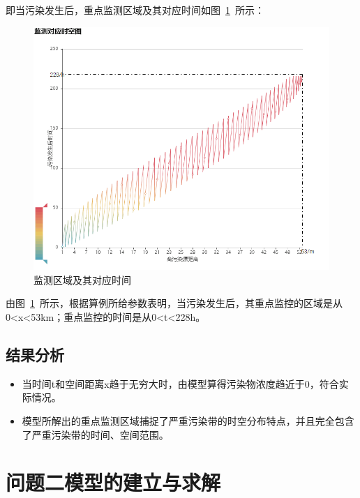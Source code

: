 \documentclass{whutmod}
\begin{document}
	即当污染发生后，重点监测区域及其对应时间如图~\ref{hblq}~所示：
			\begin{figure}[H]
		\centering
		\includegraphics[width=.9\textwidth]{figures/hblj.png}
		\caption{监测区域及其对应时间}\label{hblq}
	\end{figure}
	由图~\ref{hblq}~所示，根据算例所给参数表明，当污染发生后，其重点监控的区域是从0<x<53km；重点监控的时间是从0<t<228h。

	
	\subsection{结果分析}
	\begin{itemize}
		\item [(1)] 当时间t和空间距离x趋于无穷大时，由模型算得污染物浓度趋近于0，符合实际情况。
		\item [(2)] 
	模型所解出的重点监测区域捕捉了严重污染带的时空分布特点，并且完全包含了严重污染带的时间、空间范围。

	\end{itemize}

	\section{问题二模型的建立与求解}
\end{document}
